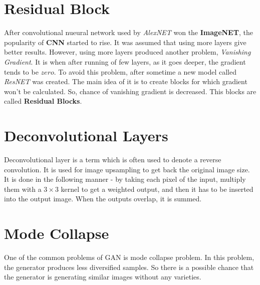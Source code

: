\begin{appendices}
\section{Residual Block}
\label{appendix:resblock}
After convolutional nueural network used by \textit{AlexNET} won the \textbf{ImageNET}, the popularity of \textbf{CNN} started to rise. It was assumed that using more layers give better results. However, using more layers produced another problem, \textit{Vanishing Gradient}. It is when after running of few layers, as it goes deeper, the gradient tends to be $zero$. To avoid this problem, after sometime a new model called \textit{ResNET} was created. The main idea of it is to create blocks for which gradient won't be calculated. So, chance of vanishing gradient is decreased. This blocks are called \textbf{Residual Blocks}.
\section{Deconvolutional Layers}
\label{appendix:deconv}

Deconvolutional layer is a term which is often used to denote a reverse convolution. It is used for image upsampling to get back the original image size. It is done in the following manner - by taking each pixel of the input, multiply them with a $3 \times 3$ kernel to get a weighted output, and then it has to be inserted into the output image. When the outputs overlap, it is summed.
\section{Mode Collapse}
\label{mode_collapse}
One of the common problems of GAN is mode collapse problem. In this problem, the generator produces less diversified samples. So there is a possible chance that the generator is generating similar images without any varieties.
 
\end{appendices}

